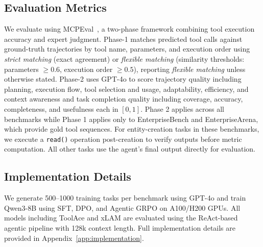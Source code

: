 \documentclass{article}
\theoremstyle{plain}
\theoremstyle{definition}
\theoremstyle{remark}
\begin{document}
\subsection{Evaluation Metrics}
\label{sec:metrics}
\vspace{-0.2cm}
We evaluate using MCPEval~\cite{liu2025mcpeval}, a two-phase framework combining tool execution accuracy and expert judgment. Phase-1 matches predicted tool calls against ground-truth trajectories by tool name, parameters, and execution order using \textit{strict matching} (exact agreement) or \textit{flexible matching} (similarity thresholds: parameters $\geq0.6$, execution order $\geq0.5$), reporting \textit{flexible matching} unless otherwise stated. Phase-2 uses GPT-4o to score trajectory quality including planning, execution flow, tool selection and usage, adaptability, efficiency, and context awareness and task completion quality including coverage, accuracy, completeness, and usefulness each in $[0,1]$. Phase 2 applies across all benchmarks while Phase 1 applies only to EnterpriseBench and EnterpriseArena, which provide gold tool sequences. For entity-creation tasks in these benchmarks, we execute a \texttt{read()} operation post-creation to verify outputs before metric computation. All other tasks use the agent's final output directly for evaluation.


\vspace{-0.2cm}
\subsection{Implementation Details}
\label{sec:implementation}
\vspace{-0.2cm}
We generate 500–1000 training tasks per benchmark using GPT-4o and train Qwen3-8B using SFT, DPO, and Agentic GRPO on A100/H200 GPUs. All models including ToolAce and xLAM are evaluated using the ReAct-based agentic pipeline with 128k context length. Full implementation details are provided in Appendix~\ref{app:implementation}.

\vspace{-0.2cm}
\end{document}
